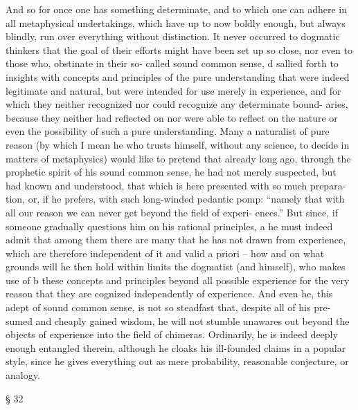 And so for once one has something determinate, and to which one can
adhere in all metaphysical undertakings, which have up to now boldly
enough, but always blindly, run over everything without distinction. It
never occurred to dogmatic thinkers that the goal of their efforts might
have been set up so close, nor even to those who, obstinate in their so-
called sound common sense, d sallied forth to insights with concepts and
principles of the pure understanding that were indeed legitimate and
natural, but were intended for use merely in experience, and for which
they neither recognized nor could recognize any determinate bound-
aries, because they neither had reﬂected on nor were able to reﬂect on
the nature or even the possibility of such a pure understanding.
Many a naturalist of pure reason (by which I mean he who trusts
himself, without any science, to decide in matters of metaphysics) would
like to pretend that already long ago, through the prophetic spirit of
his sound common sense, he had not merely suspected, but had known
and understood, that which is here presented with so much prepara-
tion, or, if he prefers, with such long-winded pedantic pomp: “namely
that with all our reason we can never get beyond the ﬁeld of experi-
ences.” But since, if someone gradually questions him on his rational
principles, a he must indeed admit that among them there are many that
he has not drawn from experience, which are therefore independent of
it and valid a priori – how and on what grounds will he then hold within
limits the dogmatist (and himself), who makes use of b these concepts
and principles beyond all possible experience for the very reason that
they are cognized independently of experience. And even he, this adept
of sound common sense, is not so steadfast that, despite all of his pre-
sumed and cheaply gained wisdom, he will not stumble unawares out
beyond the objects of experience into the ﬁeld of chimeras. Ordinarily,
he is indeed deeply enough entangled therein, although he cloaks his
ill-founded claims in a popular style, since he gives everything out as
mere probability, reasonable conjecture, or analogy.

§ 32

